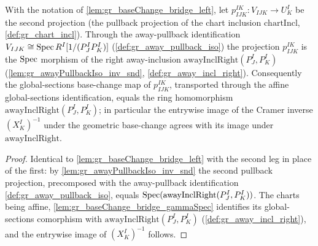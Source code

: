 \begin{lemma}\leanok
  \label{lem:gr_baseChange_bridge_right}
  With the notation of \cref{lem:gr_baseChange_bridge_left}, let
  \(p^{IK}_{IJK} : V_{IJK} \to U^I_K\) be the second projection (the pullback projection of the
  chart inclusion \(\mathrm{chartIncl}\), \cref{def:gr_chart_incl}). Through the away-pullback
  identification \(V_{IJK} \cong \operatorname{Spec} R^I[1/(P^I_J P^I_K)]\) (\cref{def:gr_away_pullback_iso})
  the projection \(p^{IK}_{IJK}\) is the \(\operatorname{Spec}\) morphism of the right away-inclusion
  \(\mathrm{awayInclRight}(P^I_J, P^I_K)\) (\cref{lem:gr_awayPullbackIso_inv_snd},
  \cref{def:gr_away_incl_right}). Consequently the global-sections base-change map of
  \(p^{IK}_{IJK}\), transported through the affine global-sections identification, equals the
  ring homomorphism \(\mathrm{awayInclRight}(P^I_J, P^I_K)\); in particular the entrywise image of
  the Cramer inverse \((X^I_K)^{-1}\) under the geometric base-change agrees with its image under
  \(\mathrm{awayInclRight}\).
\end{lemma}
\begin{proof}
  Identical to \cref{lem:gr_baseChange_bridge_left} with the second leg in place of the first:
  by \cref{lem:gr_awayPullbackIso_inv_snd} the second pullback projection, precomposed with the
  away-pullback identification \cref{def:gr_away_pullback_iso}, equals
  \(\operatorname{Spec}(\mathrm{awayInclRight}(P^I_J, P^I_K))\). The charts being affine,
  \cref{lem:gr_baseChange_bridge_gammaSpec} identifies its global-sections comorphism with
  \(\mathrm{awayInclRight}(P^I_J, P^I_K)\) (\cref{def:gr_away_incl_right}), and the entrywise
  image of \((X^I_K)^{-1}\) follows.
\end{proof}

